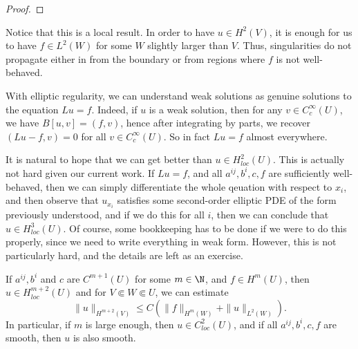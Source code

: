 \documentclass[a4paper]{article}
\begin{document}
\begin{proof}
\end{proof}
Notice that this is a local result. In order to have $u \in H^2(V)$, it is enough for us to have $f \in L^2(W)$ for some $W$ slightly larger than $V$. Thus, singularities do not propagate either in from the boundary or from regions where $f$ is not well-behaved.

With elliptic regularity, we can understand weak solutions as genuine solutions to the equation $Lu = f$. Indeed, if $u$ is a weak solution, then for any $v \in C_c^\infty(U)$, we have $B[u, v] = (f, v)$, hence after integrating by parts, we recover $(Lu - f, v) = 0$ for all $v \in C_c^\infty(U)$. So in fact $Lu = f$ almost everywhere.

It is natural to hope that we can get better than $u \in H^2_{loc}(U)$. This is actually not hard given our current work. If $Lu = f$, and all $a^{ij}, b^i, c, f$ are sufficiently well-behaved, then we can simply differentiate the whole qeuation with respect to $x_i$, and then observe that $u_{x_i}$ satisfies some second-order elliptic PDE of the form previously understood, and if we do this for all $i$, then we can conclude that $u \in H^3_{loc}(U)$. Of course, some bookkeeping has to be done if we were to do this properly, since we need to write everything in weak form. However, this is not particularly hard, and the details are left as an exercise.

\begin{thm}
  If $a^{ij}, b^i$ and $c$ are $C^{m + 1}(U)$ for some $m \in \N$, and $f \in H^m(U)$, then $u \in H^{m + 2}_{loc}(U)$ and for $V \Subset W \Subset U$, we can estimate
  \[
    \|u\|_{H^{m + 2}(V)} \leq C (\|f\|_{H^m(W)} + \|u\|_{L^2(W)}).
  \]
  In particular, if $m$ is large enough, then $u \in C^2_{loc}(U)$, and if all $a^{ij}, b^i, c, f$ are smooth, then $u$ is also smooth.
\end{thm}
\end{document}
